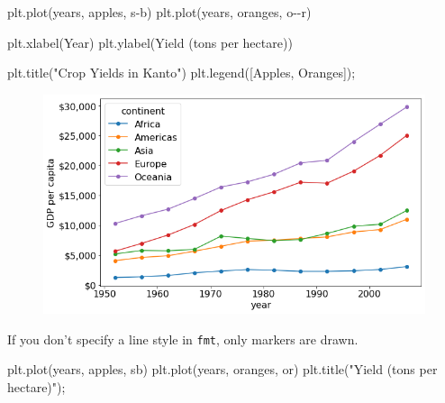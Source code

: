 \documentclass[
  letterpaper,
  DIV=11,
  numbers=noendperiod]{scrreprt}
\newenvironment{Shaded}{\begin{snugshade}}{\end{snugshade}}
\newcommand{\NormalTok}[1]{\textcolor[rgb]{0.00,0.23,0.31}{#1}}
\newcommand{\OperatorTok}[1]{\textcolor[rgb]{0.37,0.37,0.37}{#1}}
\newcommand{\StringTok}[1]{\textcolor[rgb]{0.13,0.47,0.30}{#1}}
\begin{document}
\begin{Shaded}
\begin{Highlighting}[]
\NormalTok{plt.plot(years, apples, }\StringTok{\textquotesingle{}s{-}b\textquotesingle{}}\NormalTok{)}
\NormalTok{plt.plot(years, oranges, }\StringTok{\textquotesingle{}o{-}{-}r\textquotesingle{}}\NormalTok{)}

\NormalTok{plt.xlabel(}\StringTok{\textquotesingle{}Year\textquotesingle{}}\NormalTok{)}
\NormalTok{plt.ylabel(}\StringTok{\textquotesingle{}Yield (tons per hectare)\textquotesingle{}}\NormalTok{)}

\NormalTok{plt.title(}\StringTok{"Crop Yields in Kanto"}\NormalTok{)}
\NormalTok{plt.legend([}\StringTok{\textquotesingle{}Apples\textquotesingle{}}\NormalTok{, }\StringTok{\textquotesingle{}Oranges\textquotesingle{}}\NormalTok{])}\OperatorTok{;}
\end{Highlighting}
\end{Shaded}

\begin{figure}[H]

{\centering \includegraphics{Data visualization_files/figure-pdf/cell-18-output-1.png}

}

\end{figure}

If you don't specify a line style in \texttt{fmt}, only markers are
drawn.

\begin{Shaded}
\begin{Highlighting}[]
\NormalTok{plt.plot(years, apples, }\StringTok{\textquotesingle{}sb\textquotesingle{}}\NormalTok{)}
\NormalTok{plt.plot(years, oranges, }\StringTok{\textquotesingle{}or\textquotesingle{}}\NormalTok{)}
\NormalTok{plt.title(}\StringTok{"Yield (tons per hectare)"}\NormalTok{)}\OperatorTok{;}
\end{Highlighting}
\end{Shaded}
\end{document}
